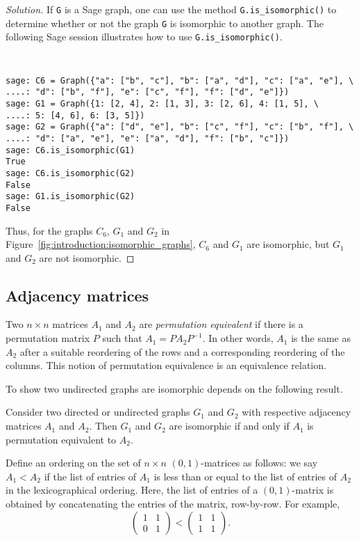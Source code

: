 \begin{proof}[Solution]
If \verb!G! is a Sage graph, one can use the method
\verb!G.is_isomorphic()! to determine whether or not the graph
\verb!G! is isomorphic to another graph. The following Sage session
illustrates how to use \verb!G.is_isomorphic()!.
%
\begin{center}
\fontsize{9pt}{9pt}
\selectfont
\tt
\begin{lstlisting}
sage: C6 = Graph({"a": ["b", "c"], "b": ["a", "d"], "c": ["a", "e"], \
....: "d": ["b", "f"], "e": ["c", "f"], "f": ["d", "e"]})
sage: G1 = Graph({1: [2, 4], 2: [1, 3], 3: [2, 6], 4: [1, 5], \
....: 5: [4, 6], 6: [3, 5]})
sage: G2 = Graph({"a": ["d", "e"], "b": ["c", "f"], "c": ["b", "f"], \
....: "d": ["a", "e"], "e": ["a", "d"], "f": ["b", "c"]})
sage: C6.is_isomorphic(G1)
True
sage: C6.is_isomorphic(G2)
False
sage: G1.is_isomorphic(G2)
False
\end{lstlisting}
\end{center}
%
Thus, for the graphs $C_6$, $G_1$ and $G_2$ in
Figure~\ref{fig:introduction:isomorphic_graphs}, $C_6$ and $G_1$ are
isomorphic, but $G_1$ and $G_2$ are not isomorphic.
\end{proof}



\subsection{Adjacency matrices}

Two $n \times n$ matrices $A_1$ and $A_2$ are
\emph{permutation equivalent} if there is a permutation matrix $P$
such that $A_1 = PA_2P^{-1}$. In other words, $A_1$ is the same as
$A_2$ after a suitable reordering of the rows and a corresponding
reordering of the columns.\index{permutation equivalent} This notion
of permutation equivalence is an equivalence relation.

To show two undirected graphs are isomorphic depends on the following
result.

\begin{theorem}
Consider two directed or undirected graphs $G_1$ and $G_2$ with
respective adjacency matrices $A_1$ and $A_2$. Then $G_1$ and $G_2$
are isomorphic if and only if $A_1$ is permutation equivalent to
$A_2$.
\end{theorem}

Define an ordering on the set of $n \times n$ $(0, 1)$-matrices as
follows: we say $A_1 < A_2$ if the list of entries of $A_1$ is less
than or equal to the list of entries of $A_2$ in the lexicographical
ordering. Here, the list of entries of a $(0, 1)$-matrix is obtained
by concatenating the entries of the matrix, row-by-row. For example,
\[
\begin{pmatrix}
1 & 1 \\
0 & 1
\end{pmatrix}
<
\begin{pmatrix}
1 & 1 \\
1 & 1
\end{pmatrix}.
\]

